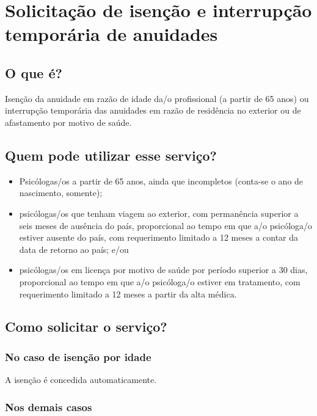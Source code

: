 \chapter{Solicitação de isenção e interrupção temporária de anuidades}
\label{chap:pf-isencao}

\section{O que é?}

Isenção da anuidade em razão de idade da/o profissional (a partir de 65 anos) ou interrupção temporária das anuidades em razão de residência no exterior ou de afastamento por motivo de saúde.

\section{Quem pode utilizar esse serviço?}

\begin{itemize}
  \item  Psicólogas/os a partir de 65 anos, ainda que incompletos (conta-se o  ano de nascimento, somente);
  \item  psicólogas/os que tenham viagem ao exterior, com permanência superior  a seis meses de ausência do país, proporcional ao tempo em que a/o psicóloga/o estiver ausente do país, com requerimento limitado a 12  meses a contar da data de retorno ao país; e/ou
  \item  psicólogas/os em licença por motivo de saúde por período superior a 30  dias, proporcional ao tempo em que a/o psicóloga/o estiver em  tratamento, com requerimento limitado a 12 meses a partir da alta médica.
\end{itemize}

\section{Como solicitar o serviço?}

\subsection{No caso de isenção por idade}

A isenção é concedida automaticamente.

\subsection{Nos demais casos}

